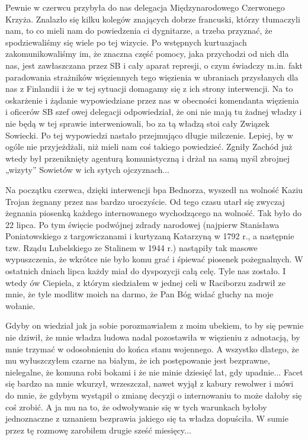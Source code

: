 Pewnie w czerwcu przybyła do nas delegacja Międzynarodowego Czerwonego Krzyża. Znalazło się kilku kolegów znających dobrze francuski, którzy tłumaczyli nam, to co mieli nam do powiedzenia ci dygnitarze, a trzeba przyznać, że spodziewaliśmy się wiele po tej wizycie. Po wstępnych kurtuazjach zakomunikowaliśmy im, że znaczna część pomocy, jaka przychodzi od nich dla nas, jest zawłaszczana przez SB i cały aparat represji, o czym świadczy m.in. fakt paradowania strażników więziennych tego więzienia w ubraniach przysłanych dla nas z Finlandii i że w tej sytuacji domagamy się z ich strony interwencji. Na to oskarżenie i żądanie wypowiedziane przez nas w obecności komendanta więzienia i oficerów SB szef owej delegacji odpowiedział, że oni nie mają tu żadnej władzy i nie będą w tej sprawie interweniowali, bo za tą władzą stoi cały Związek Sowiecki. Po tej wypowiedzi nastało przejmująco długie milczenie. Lepiej, by w ogóle nie przyjeżdżali, niż mieli nam coś takiego powiedzieć. Zgniły Zachód już wtedy był przeniknięty agenturą komunistyczną i drżał na samą myśl zbrojnej „wizyty” Sowietów w ich sytych ojczyznach...

Na początku czerwca, dzięki interwencji bpa Bednorza, wyszedł na wolność Kaziu Trojan żegnany przez nas bardzo uroczyście. Od tego czasu utarł się zwyczaj żegnania piosenką każdego internowanego wychodzącego na wolność. Tak było do 22 lipca. Po tym święcie podwójnej zdrady narodowej (najpierw Stanisława Poniatowskiego z targowiczanami i kurtyzaną Katarzyną w 1792 r., a następnie tzw. Rządu Lubelskiego ze Stalinem w 1944 r.) nastąpiły tak masowe wypuszczenia, że wkrótce nie było komu grać i śpiewać piosenek pożegnalnych. W ostatnich dniach lipca każdy miał do dyspozycji całą celę. Tyle nas zostało. I wtedy ów Ciepiela, z którym siedziałem w jednej celi w Raciborzu zadrwił ze mnie, że tyle modlitw moich na darmo, że Pan Bóg widać głuchy na moje wołanie. 

Gdyby on wiedział jak ja sobie porozmawiałem z moim ubekiem, to by się pewnie nie dziwił, że mnie władza ludowa nadal pozostawiła w więzieniu z adnotacją, by mnie trzymać w odosobnieniu do końca stanu wojennego. A wszystko dlatego, że mu wyłuszczyłem czarne na białym, że ich postępowanie jest bezprawne, nielegalne, że komuna robi bokami i że nie minie dziesięć lat, gdy upadnie... Facet się bardzo na mnie wkurzył, wrzeszczał, nawet wyjął z kabury rewolwer i mówi do mnie, że gdybym wystąpił o zmianę  decyzji o internowaniu to może dałoby się coś zrobić. A ja mu na to, że odwoływanie się w tych warunkach byłoby jednoznaczne z uznaniem bezprawia jakiego się ta władza dopuściła. W sumie przez tę rozmowę zarobiłem drugie sześć miesięcy...

